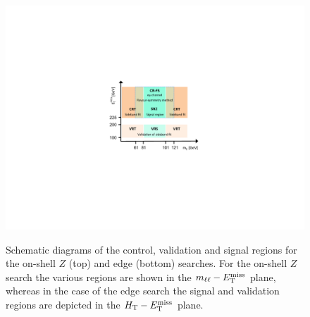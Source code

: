 \begin{figure}[h]
\centering
\includegraphics[width=.8\textwidth]{figures/fs/FSdiagram_v2.pdf}\\
\caption{
Schematic diagrams of the control, validation and signal regions for the on-shell $Z$ (top) and edge (bottom) searches.
For the on-shell $Z$ search the various regions are shown in the $m_{\ell\ell}-E_{\text{T}}^{\text{miss}}$ plane, whereas in the case of the edge search the
signal and validation regions are depicted in the $H_{\text{T}}-E_{\text{T}}^{\text{miss}}$ plane.
\label{fig:region_diagrams}
}
\end{figure}


